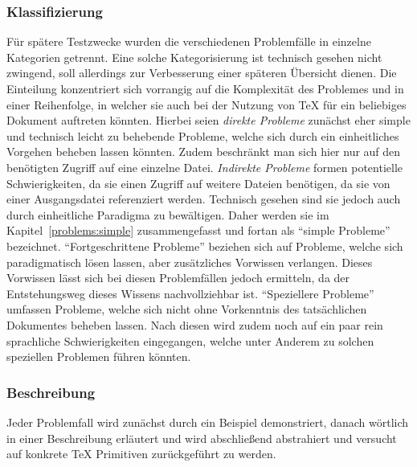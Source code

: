 \subsubsection{Klassifizierung}
Für spätere Testzwecke wurden die verschiedenen Problemfälle in einzelne Kategorien getrennt. Eine solche Kategorisierung ist technisch gesehen nicht zwingend, soll allerdings zur Verbesserung einer späteren Übersicht dienen. Die Einteilung konzentriert sich vorrangig auf die Komplexität des Problemes und in einer Reihenfolge, in welcher sie auch bei der Nutzung von \TeX{} für ein beliebiges Dokument auftreten könnten. 
%
Hierbei seien \textit{direkte Probleme} zunächst eher simple und technisch leicht zu behebende Probleme, welche sich durch ein einheitliches Vorgehen beheben lassen könnten.%
Zudem beschränkt man sich hier nur auf den benötigten Zugriff auf eine einzelne Datei.
%
\textit{Indirekte Probleme} formen potentielle Schwierigkeiten, da sie einen Zugriff auf weitere Dateien benötigen, da sie von einer Ausgangsdatei referenziert werden. Technisch gesehen sind sie jedoch auch durch einheitliche Paradigma zu bewältigen. Daher werden sie im Kapitel~\ref{problems:simple} zusammengefasst und fortan als \enquote{simple Probleme} bezeichnet.
%
\enquote{Fortgeschrittene Probleme} beziehen sich auf Probleme, welche sich paradigmatisch lösen lassen, %
aber zusätzliches Vorwissen verlangen. Dieses Vorwissen lässt sich bei diesen Problemfällen jedoch ermitteln, da der Entstehungsweg dieses Wissens nachvollziehbar ist.%
\enquote{Speziellere Probleme} umfassen Probleme, welche sich nicht ohne Vorkenntnis des tatsächlichen Dokumentes beheben lassen. Nach diesen wird zudem noch auf ein paar rein sprachliche Schwierigkeiten eingegangen, welche unter Anderem zu solchen speziellen Problemen führen könnten.

\subsubsection{Beschreibung}
Jeder Problemfall wird zunächst durch ein Beispiel demonstriert, danach wörtlich in einer Beschreibung erläutert und wird abschließend abstrahiert und versucht auf konkrete \TeX{} Primitiven zurückgeführt zu werden. 

